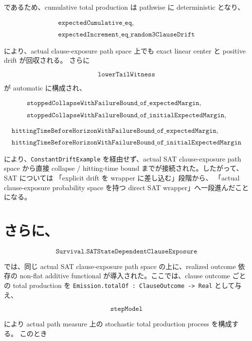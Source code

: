 \documentclass[12pt,a4paper]{article}
\begin{document}
であるため、cumulative total production は pathwise に deterministic となり、

\[
\begin{aligned}
\texttt{expectedCumulative\_eq}, \\
\qquad \\
\texttt{expectedIncrement\_eq\_random3ClauseDrift}
\end{aligned}
\]

により、actual clause-exposure path space 上でも exact linear center と positive drift が回収される。 さらに

\[
\texttt{lowerTailWitness}
\]

が automatic に構成され、

\[
\begin{aligned}
\texttt{stoppedCollapseWithFailureBound\_of\_expectedMargin}, \\
\qquad \\
\texttt{stoppedCollapseWithFailureBound\_of\_initialExpectedMargin},
\end{aligned}
\]

\[
\begin{aligned}
\texttt{hittingTimeBeforeHorizonWithFailureBound\_of\_expectedMargin}, \\
\qquad \\
\texttt{hittingTimeBeforeHorizonWithFailureBound\_of\_initialExpectedMargin}
\end{aligned}
\]

により、\texttt{ConstantDriftExample} を経由せず、actual SAT clause-exposure path space から直接 collapse / hitting-time bound までが接続された。したがって、SAT については 「explicit drift を wrapper に差し込む」段階から、 「actual clause-exposure probability space を持つ direct SAT wrapper」へ一段進んだことになる。

\section{さらに、}\label{ux3055ux3089ux306b-16}

\[
\texttt{Survival.SATStateDependentClauseExposure}
\]

では、同じ actual SAT clause-exposure path space の上に、realized outcome 依存の non-flat additive functional が導入された。ここでは、clause outcome ごとの total production を \texttt{Emission.totalOf\ :\ ClauseOutcome\ -\textgreater{}\ Real} として与え、

\[
\texttt{stepModel}
\]

により actual path measure 上の stochastic total production process を構成する。 このとき
\end{document}
